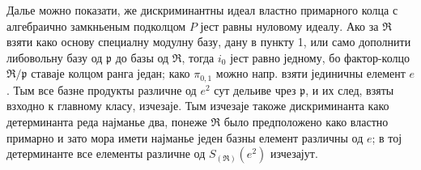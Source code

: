 \documentclass[11pt]{article}
\begin{document}
\setcounter{footnote}{27}

Далье можно показати, же дискриминантны идеал властно примарного колца с алгебраично замкньеным подколцом $P$ јест равны нуловому идеалу. Ако за $\mathfrak R$ взяти како основу специалну модулну базу, дану в пункту 1, или само дополнити либовольну базу од $\mathfrak p$ до базы од $\mathfrak R$, тогда $i_0$ јест равно једному, бо фактор-колцо $\mathfrak R/\mathfrak p$ ставаје колцом ранга један; како $\pi_{0,1}$ можно напр. взяти јединичны елемент $e$. Тым все базне продукты различне од $e^2$ сут дельиве чрез $\mathfrak p$, и их след, взяты взходно к главному класу, изчезаје. Тым изчезаје такоже дискриминанта како детерминанта реда најманье два, понеже $\mathfrak R$ было предположено како властно примарно и зато мора имети најманье једен базны елемент различны од $e$; в тој детерминанте все елементы различне од $S_{(\mathfrak R)}(e^2)$ изчезајут.
\end{document}
